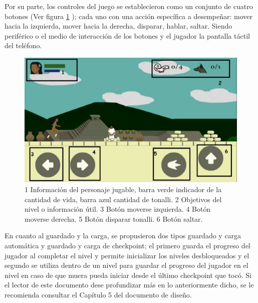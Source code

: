 \par
Por su parte, los controles del juego se establecieron como un conjunto de cuatro 
botones (Ver figura \ref{fig:GUI} ); cada uno con una acción específica a 
desempeñar: mover hacia la izquierda, mover hacia la derecha, disparar, hablar, 
saltar. Siendo periférico o el medio de interacción de los botones y el jugador 
la pantalla táctil del teléfono.  

\begin{figure}
				\centering
				\includegraphics[height=0.3 \textheight]{05TrabajoRealizado/01DocDiseno02/imagenes/ControlCorrerDer}
				\caption{1 Información del personaje jugable, barra verde indicador 
				de la cantidad de vida, barra azul cantidad de tonalli. 2 Objetivos 
				del nivel o información útil. 3 Botón moverse izquierda. 4 Botón 
				moverse derecha. 5 Botón disparar tonalli. 6 Botón saltar.}
				\label{fig:GUI}
\end{figure}


\par
En cuanto al guardado y la carga, se propusieron dos tipos guardado y carga automática 
y guardado y carga de checkpoint; el primero guarda el progreso del jugador al 
completar el nivel y permite inicializar los niveles desbloqueados y el segundo 
se utiliza dentro de un nivel para guardar el progreso del jugador en el nivel 
en caso de que muera pueda iniciar desde el último checkpoint que tocó. 
Si el lector de este documento dese profundizar más en lo anteriormente dicho, 
se le recomienda consultar el Capítulo 5 del documento de diseño.